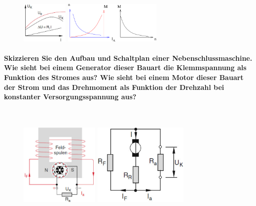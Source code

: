 \documentclass[a4paper, 11pt, parskip=half]{scrartcl}
\begin{document}
\begin{figure}[H]
    \centering
    \begin{minipage}[b]{0.3\textwidth}
        \centering
        \includegraphics[height=2cm]{image/8/3.3}
    \end{minipage}
    \hspace{2cm}
    \begin{minipage}[b]{0.3\textwidth}
        \centering
        \includegraphics[height=2cm]{image/8/3.4}
    \end{minipage}
\end{figure}

\paragraph{Skizzieren Sie den Aufbau und Schaltplan einer Nebenschlussmaschine. Wie sieht bei einem
Generator dieser Bauart die Klemmspannung als Funktion des Stromes aus? Wie sieht bei einem Motor
dieser Bauart der Strom und das Drehmoment als Funktion der Drehzahl bei konstanter
Versorgungsspannung aus?} ~

\begin{figure}[H]
    \centering
    \begin{minipage}[b]{0.3\textwidth}
        \centering
        \includegraphics[height=4cm]{image/8/4.1}
    \end{minipage}
    \hspace{2cm}
    \begin{minipage}[b]{0.3\textwidth}
        \centering
        \includegraphics[height=4cm]{image/8/4.2}
    \end{minipage}
\end{figure}
\end{document}
